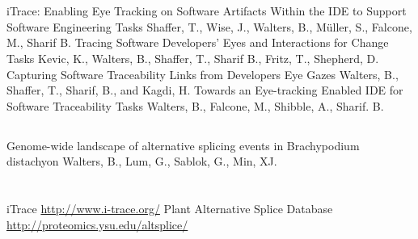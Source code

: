 \documentclass[8pt,a4paper]{moderncv}
\begin{document}
  \section{\textbf{\ignorespaces
                   }}
  \subsection{}
          {iTrace: Enabling Eye Tracking on Software Artifacts Within the IDE to Support Software Engineering Tasks}
          {Shaffer, T., Wise, J., Walters, B., M\"uller, S., Falcone, M., Sharif B.}
          {}{}{}
          {Tracing Software Developers’ Eyes and Interactions for Change Tasks}
          {Kevic, K., Walters, B., Shaffer, T., Sharif B., Fritz, T., Shepherd, D.}
          {}{}{}
          {Capturing Software Traceability Links from Developers Eye Gazes}
          {Walters, B., Shaffer, T., Sharif, B., and Kagdi, H.}
          {}{}{}
          {Towards an Eye-tracking Enabled IDE for Software Traceability Tasks}
          {Walters, B., Falcone, M., Shibble, A., Sharif. B.}
          {}{}{}
  \vspace{1mm}
  \subsection{}
          {Genome-wide landscape of alternative splicing events in Brachypodium distachyon}
          {Walters, B., Lum, G., Sablok, G., Min, XJ.}
          {}{}{}

  \section{\textbf{\ignorespaces
                   }}
          {iTrace}
          {\ignorespaces
           }
          {}{}{\url{http://www.i-trace.org/}}
          {Plant Alternative Splice Database}
          {\ignorespaces
           }
          {}{}{\url{http://proteomics.ysu.edu/altsplice/}}
\end{document}
